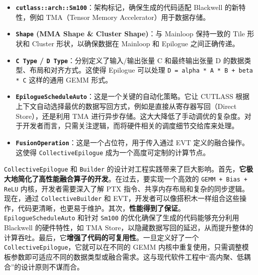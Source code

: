 \begin{itemize}
\item \textbf{\texttt{cutlass::\allowbreak{}arch::\allowbreak{}Sm100}}：架构标记，确保生成的代码适配 Blackwell 的新特性，例如 TMA（Tensor Memory Accelerator）用于数据存储。
\item \textbf{\texttt{Shape} (MMA Shape \& Cluster Shape)}：与 Mainloop 保持一致的 Tile 形状和 Cluster 形状，以确保数据在 Mainloop 和 Epilogue 之间正确传递。
\item \textbf{\texttt{C Type} /\allowbreak{} \texttt{D Type}}：分别定义了输入/\allowbreak{}输出张量 C 和最终输出张量 D 的数据类型、布局和对齐方式。这使得 Epilogue 可以处理 \texttt{D\allowbreak{} \allowbreak{}=\allowbreak{} \allowbreak{}a\allowbreak{}l\allowbreak{}p\allowbreak{}h\allowbreak{}a\allowbreak{} \allowbreak{}*\allowbreak{} \allowbreak{}A\allowbreak{} \allowbreak{}*\allowbreak{} \allowbreak{}B\allowbreak{} \allowbreak{}+\allowbreak{} \allowbreak{}b\allowbreak{}e\allowbreak{}t\allowbreak{}a\allowbreak{} \allowbreak{}*\allowbreak{} \allowbreak{}C} 这样的通用 GEMM 形式。
\item \textbf{\texttt{Epilogue\allowbreak{}Schedule\allowbreak{}Auto}}：这是一个关键的自动化策略。它让 CUTLASS 根据上下文自动选择最优的数据写回方式，例如是直接从寄存器写回（Direct Store），还是利用 TMA 进行异步存储。这大大降低了手动调优的复杂度。对于开发者而言，只需关注逻辑，而将硬件相关的调度细节交给库来处理。
\item \textbf{\texttt{Fusion\allowbreak{}Operation}}：这是一个占位符，用于传入通过 EVT 定义的融合操作。这使得 \texttt{Collective\allowbreak{}Epilogue} 成为一个高度可定制的计算节点。
\end{itemize}

\texttt{Collective\allowbreak{}Epilogue} 和 \texttt{Builder} 的设计对工程实践带来了巨大影响。首先，\textbf{它极大地简化了高性能融合算子的开发}。在过去，要实现一个高效的 \texttt{GEMM + Bias + Re\allowbreak{}LU} 内核，开发者需要深入了解 PTX 指令、共享内存布局和复杂的同步逻辑。现在，通过 \texttt{Collective\allowbreak{}Builder} 和 EVT，开发者可以像搭积木一样组合这些操作，代码更清晰，也更易于维护。其次，\textbf{性能得到了保证}。\texttt{Epilogue\allowbreak{}Schedule\allowbreak{}Auto} 和针对 \texttt{Sm100} 的优化确保了生成的代码能够充分利用 Blackwell 的硬件特性，如 TMA Store，以隐藏数据写回的延迟，从而提升整体的计算吞吐。最后，它\textbf{增强了代码的可复用性}。一旦定义好了一个 \texttt{Collective\allowbreak{}Epilogue}，它就可以在不同的 GEMM 内核中重复使用，只需调整模板参数即可适应不同的数据类型或融合需求。这与现代软件工程中“高内聚、低耦合”的设计原则不谋而合。

